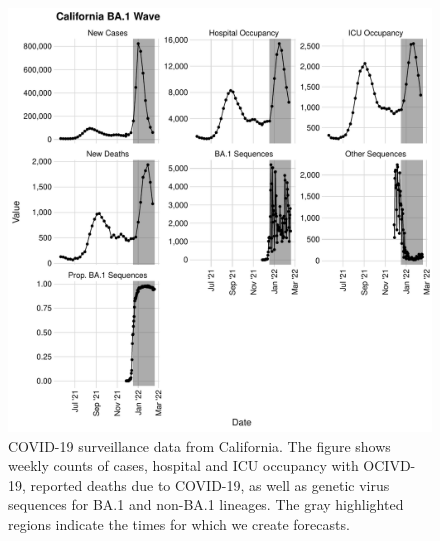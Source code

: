 \begin{figure}
    \centering
    \includegraphics[width=1.0\columnwidth]{figures/ch_5/california_binned_data_plot.pdf}
    \caption[COVID-19 surveillance data from California.]{
COVID-19 surveillance data from California.
The figure shows weekly counts of cases, hospital and ICU occupancy with OCIVD-19, reported deaths due to COVID-19, as well as genetic virus sequences for BA.1 and non-BA.1 lineages.
The gray highlighted regions indicate the times for which we create forecasts.}
    \label{ch_1:fig:california_binned_data_plot}
\end{figure}


